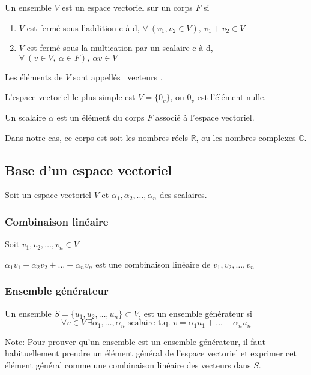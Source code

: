 \begin{definition}
      Un ensemble $V$ est un espace vectoriel sur un corps $F$
      si \begin{enumerate}[1)]
            \item $V$ est fermé sous l'addition c-à-d, $
                        \forall \ (v_1, v_2 \in V), \ v_1 + v_2 \in V
                  $
            \item $V$ est fermé sous la multication par un scalaire c-à-d, $
                        \forall \ (v \in V, \ \alpha \in F), \ \alpha v \in V
                  $
      \end{enumerate}
      Les éléments de $V$ sont appellés \guillemetleft \ vecteurs \guillemetright.
\end{definition}
\begin{remark}
      L'espace vectoriel le plus simple est $V = \{ 0_v \}$, ou $0_v$ est l'élément nulle.
\end{remark}
\begin{definition}
      Un scalaire $\alpha$ est un élément du corps $F$ associé à l'espace vectoriel.
\end{definition}
Dans notre cas, ce corps est soit les nombres réels $\mathbb{R}$, ou les nombres complexes $\mathbb{C}$.

\subsection{Base d'un espace vectoriel}
Soit un espace vectoriel $V$ et $\alpha_1, \alpha_2, \ldots, \alpha_n$ des scalaires.

\subsubsection{Combinaison linéaire}
Soit $v_1, v_2, \ldots, v_n \in V$
\begin{definition}
      $\alpha_1 v_1 + \alpha_2 v_2 + \ldots + \alpha_n v_n$ est une combinaison linéaire de
      $v_1, v_2, \ldots, v_n$
\end{definition}

\subsubsection{Ensemble générateur}
\begin{definition}
      Un ensemble $S = \{ u_1, u_2, \ldots, u_n \} \subset V$, est un ensemble générateur si
      \[ \forall v \in V  \ \exists \alpha_1, \ldots, \alpha_n \text{ scalaire t.q. } v = \alpha_1 u_1 + \ldots + \alpha_n u_n\]
\end{definition}
Note: Pour prouver qu'un ensemble est un ensemble générateur, il faut habituellement
prendre un élément général de l'espace vectoriel et exprimer cet élément général
comme une combinaison linéaire des vecteurs dans $S$.

